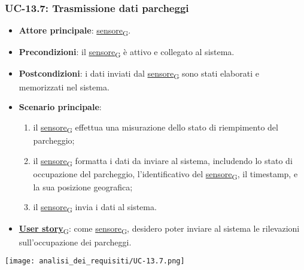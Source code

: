 \subsubsection{UC-13.7: Trasmissione dati parcheggi}
\begin{itemize}
	\item \textbf{Attore principale}: \href{https://7last.github.io/docs/pb/documentazione-interna/glossario\#sensore}{sensore\textsubscript{G}}.
	\item \textbf{Precondizioni}: il \href{https://7last.github.io/docs/pb/documentazione-interna/glossario\#sensore}{sensore\textsubscript{G}} è attivo e collegato al sistema.
	\item \textbf{Postcondizioni}: i dati inviati dal \href{https://7last.github.io/docs/pb/documentazione-interna/glossario\#sensore}{sensore\textsubscript{G}} sono stati elaborati e memorizzati nel sistema.
	\item \textbf{Scenario principale}:
	      \begin{enumerate}
		      \item il \href{https://7last.github.io/docs/pb/documentazione-interna/glossario\#sensore}{sensore\textsubscript{G}} effettua una misurazione dello stato di riempimento del parcheggio;
		      \item il \href{https://7last.github.io/docs/pb/documentazione-interna/glossario\#sensore}{sensore\textsubscript{G}} formatta i dati da inviare al sistema, includendo lo stato di occupazione del parcheggio, l'identificativo del \href{https://7last.github.io/docs/pb/documentazione-interna/glossario\#sensore}{sensore\textsubscript{G}},
		            il timestamp, e la sua posizione geografica;
		      \item il \href{https://7last.github.io/docs/pb/documentazione-interna/glossario\#sensore}{sensore\textsubscript{G}} invia i dati al sistema.
	      \end{enumerate}
	\item \href{https://7last.github.io/docs/pb/documentazione-interna/glossario\#user-story}{\textbf{User story}\textsubscript{G}}:
	      come \href{https://7last.github.io/docs/pb/documentazione-interna/glossario\#sensore}{sensore\textsubscript{G}}, desidero poter inviare al sistema le rilevazioni sull'occupazione dei parcheggi.
\end{itemize}

\begin{center}
	\texttt{[image: analisi\_dei\_requisiti/UC-13.7.png]}
\end{center}

